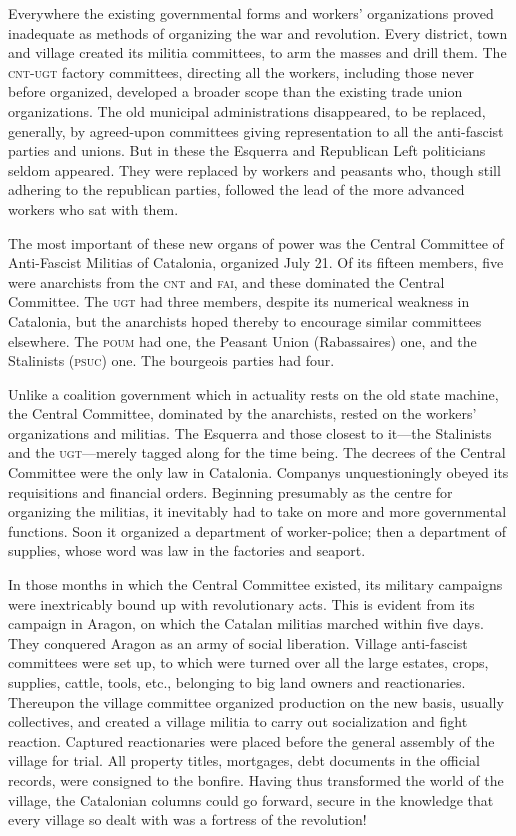 Everywhere the existing governmental forms and workers’ organizations proved inadequate as methods of organizing the war and revolution. Every district, town and village created its militia committees, to arm the masses and drill them. The \textsc{cnt-ugt} factory committees, directing all the workers, including those never before organized, developed a broader scope than the existing trade union organizations. The old municipal administrations disappeared, to be replaced, generally, by agreed-upon committees giving representation to all the anti-fascist parties and unions. But in these the Esquerra and Republican Left politicians seldom appeared. They were replaced by workers and peasants who, though still adhering to the republican parties, followed the lead of the more advanced workers who sat with them.
\nowidow

The most important of these new organs of power was the Central Committee of Anti-Fascist Militias of Catalonia, organized July 21. Of its fifteen members, five were anarchists from the \textsc{cnt} and \textsc{fai}, and these dominated the Central Committee. The \textsc{ugt} had three members, despite its numerical weakness in Catalonia, but the anarchists hoped thereby to encourage similar committees elsewhere. The \textsc{poum} had one, the Peasant Union (Rabassaires) one, and the Stalinists (\textsc{psuc}) one. The bourgeois parties had four.

Unlike a coalition government which in actuality rests on the old state machine, the Central Committee, dominated by the anarchists, rested on the workers’ organizations and militias. The Esquerra and those closest to it—the Stalinists and the \textsc{ugt}—merely tagged along for the time being. The decrees of the Central Committee were the only law in Catalonia. Companys unquestioningly obeyed its requisitions and financial orders. Beginning presumably as the centre for organizing the militias, it inevitably had to take on more and more governmental functions. Soon it organized a department of worker-police; then a department of supplies, whose word was law in the factories and seaport.

In those months in which the Central Committee existed, its military campaigns were inextricably bound up with revolutionary acts. This is evident from its campaign in Aragon, on which the Catalan militias marched within five days. They conquered Aragon as an army of social liberation. Village anti-fascist committees were set up, to which were turned over all the large estates, crops, supplies, cattle, tools, etc., belonging to big land owners and reactionaries. Thereupon the village committee organized production on the new basis, usually collectives, and created a village militia to carry out socialization and fight reaction. Captured reactionaries were placed before the general assembly of the village for trial. All property titles, mortgages, debt documents in the official records, were consigned to the bonfire. Having thus transformed the world of the village, the Catalonian columns could go forward, secure in the knowledge that every village so dealt with was a fortress of the revolution!

